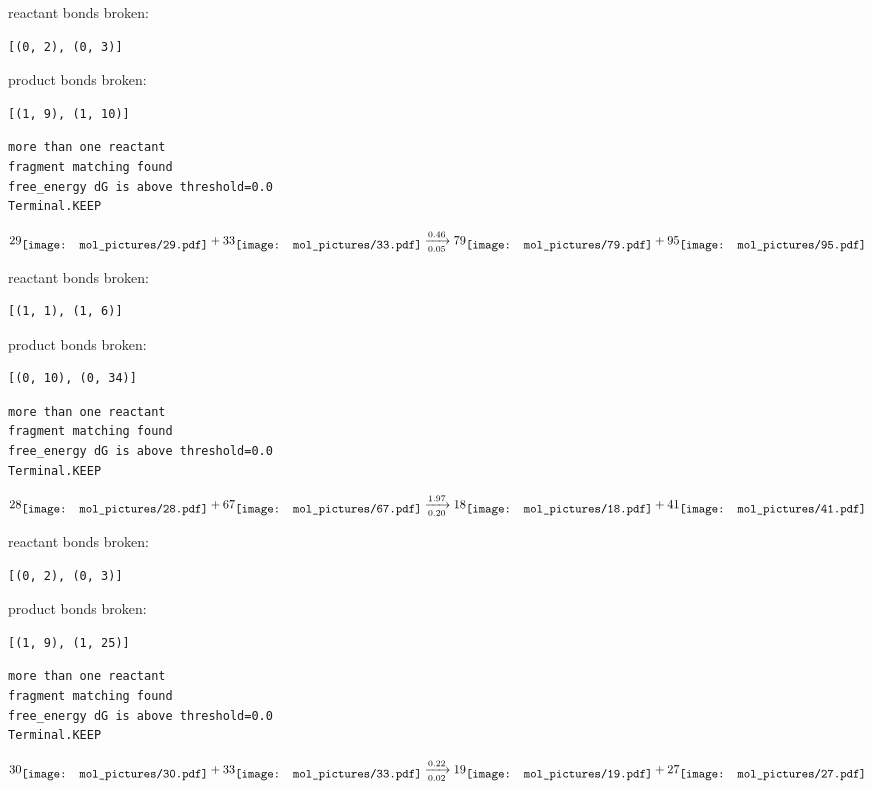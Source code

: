 \documentclass{article}
\begin{document}
reactant bonds broken:\begin{verbatim}
[(0, 2), (0, 3)]
\end{verbatim}
product bonds broken:\begin{verbatim}
[(1, 9), (1, 10)]
\end{verbatim}




\vspace{1cm}
\begin{verbatim}
more than one reactant
fragment matching found
free_energy dG is above threshold=0.0
Terminal.KEEP
\end{verbatim}
$$
29
\raisebox{-.5\height}{\texttt{[image: mol\_pictures/29.pdf]}}
+
33
\raisebox{-.5\height}{\texttt{[image: mol\_pictures/33.pdf]}}
\xrightarrow[0.05]{0.46}
79
\raisebox{-.5\height}{\texttt{[image: mol\_pictures/79.pdf]}}
+
95
\raisebox{-.5\height}{\texttt{[image: mol\_pictures/95.pdf]}}
$$


reactant bonds broken:\begin{verbatim}
[(1, 1), (1, 6)]
\end{verbatim}
product bonds broken:\begin{verbatim}
[(0, 10), (0, 34)]
\end{verbatim}




\vspace{1cm}
\begin{verbatim}
more than one reactant
fragment matching found
free_energy dG is above threshold=0.0
Terminal.KEEP
\end{verbatim}
$$
28
\raisebox{-.5\height}{\texttt{[image: mol\_pictures/28.pdf]}}
+
67
\raisebox{-.5\height}{\texttt{[image: mol\_pictures/67.pdf]}}
\xrightarrow[0.20]{1.97}
18
\raisebox{-.5\height}{\texttt{[image: mol\_pictures/18.pdf]}}
+
41
\raisebox{-.5\height}{\texttt{[image: mol\_pictures/41.pdf]}}
$$


reactant bonds broken:\begin{verbatim}
[(0, 2), (0, 3)]
\end{verbatim}
product bonds broken:\begin{verbatim}
[(1, 9), (1, 25)]
\end{verbatim}




\vspace{1cm}
\begin{verbatim}
more than one reactant
fragment matching found
free_energy dG is above threshold=0.0
Terminal.KEEP
\end{verbatim}
$$
30
\raisebox{-.5\height}{\texttt{[image: mol\_pictures/30.pdf]}}
+
33
\raisebox{-.5\height}{\texttt{[image: mol\_pictures/33.pdf]}}
\xrightarrow[0.02]{0.22}
19
\raisebox{-.5\height}{\texttt{[image: mol\_pictures/19.pdf]}}
+
27
\raisebox{-.5\height}{\texttt{[image: mol\_pictures/27.pdf]}}
$$
\end{document}

